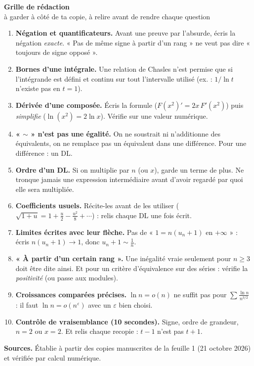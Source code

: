 \documentclass[11pt,a4paper]{article}
\begin{document}
\begin{center}
{\LARGE\bfseries Grille de rédaction}\\[0.3em]
{\large à garder à côté de ta copie, à relire avant de rendre chaque question}
\end{center}

\noindent{}


\begin{enumerate}[label=\textbf{\arabic*.},itemsep=0.9em]
\item \textbf{Négation et quantificateurs.} Avant une preuve par l'absurde, écris la négation \emph{exacte}. « Pas de même signe à partir d'un rang » ne veut pas dire « toujours de signe opposé ».
\item \textbf{Bornes d'une intégrale.} Une relation de Chasles n'est permise que si l'intégrande est défini et continu sur tout l'intervalle utilisé (ex. : $1/\ln t$ n'existe pas en $t=1$).
\item \textbf{Dérivée d'une composée.} Écris la formule ($F(x^2)'=2x\,F'(x^2)$) puis \emph{simplifie} ($\ln(x^2)=2\ln x$). Vérifie sur une valeur numérique.
\item \textbf{« $\sim$ » n'est pas une égalité.} On ne soustrait ni n'additionne des équivalents, on ne remplace pas un équivalent dans une différence. Pour une différence : un DL.
\item \textbf{Ordre d'un DL.} Si on multiplie par $n$ (ou $x$), garde un terme de plus. Ne tronque jamais une expression intermédiaire avant d'avoir regardé par quoi elle sera multipliée.
\item \textbf{Coefficients usuels.} Récite-les avant de les utiliser ($\sqrt{1+u}=1+\tfrac u2-\tfrac{u^2}8+\cdots$) : relis chaque DL une fois écrit.
\item \textbf{Limites écrites avec leur flèche.} Pas de « $1=n(u_n+1)$ en $+\infty$ » : écris $n(u_n+1)\longrightarrow 1$, donc $u_n+1\sim\frac1n$.
\item \textbf{« À partir d'un certain rang ».} Une inégalité vraie seulement pour $n\ge 3$ doit être dite ainsi. Et pour un critère d'équivalence sur des séries : vérifie la \emph{positivité} (ou passe aux modules).
\item \textbf{Croissances comparées précises.} $\ln n=o(n)$ ne suffit pas pour $\sum\frac{\ln n}{n^{3/2}}$ : il faut $\ln n=o(n^{\varepsilon})$ avec un $\varepsilon$ bien choisi.
\item \textbf{Contrôle de vraisemblance (10 secondes).} Signe, ordre de grandeur, $n=2$ ou $x=2$. Et relis chaque recopie : $t-1$ n'est pas $t+1$.
\end{enumerate}

\vfill
\begin{small}
\noindent\textbf{Sources.} Établie à partir des copies manuscrites de la feuille 1 (21 octobre 2026) et vérifiée par calcul numérique.
\end{small}
\end{document}
